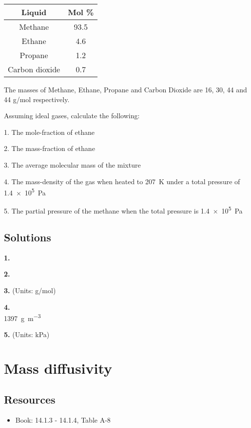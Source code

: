 \begin{tabular}[c]{|c|c|}
    \hline
    \textbf{Liquid} & \textbf{Mol \%}\\
    \hline
    Methane         & 93.5  \\
    Ethane          & 4.6   \\
    Propane         & 1.2   \\
    Carbon dioxide  & 0.7   \\
    \hline
\end{tabular}

The masses of Methane, Ethane, Propane and Carbon Dioxide are 16, 30, 44 and 44 g/mol respectively.

Assuming ideal gases, calculate the following:

1. The mole-fraction of ethane

2. The mass-fraction of ethane

3. The average molecular mass of the mixture

4. The mass-density of the gas when heated to \SI{207}{\kelvin} under a total pressure of \SI{1.4e5}{\pascal}

5. The partial pressure of the methane when the total pressure is \SI{1.4e5}{\pascal}

\subsection*{Solutions}

\textbf{1.}\\

\textbf{2.}\\

\textbf{3.} (Units: g/mol)\\

\textbf{4.}\\
\SI{1397}{\gram\per\cubic\meter}

\textbf{5.} (Units: kPa)\\




\newpage
\section{Mass diffusivity}

\subsection*{Resources}
\begin{itemize}
    \item Book: 14.1.3 - 14.1.4, Table A-8
\end{itemize}

